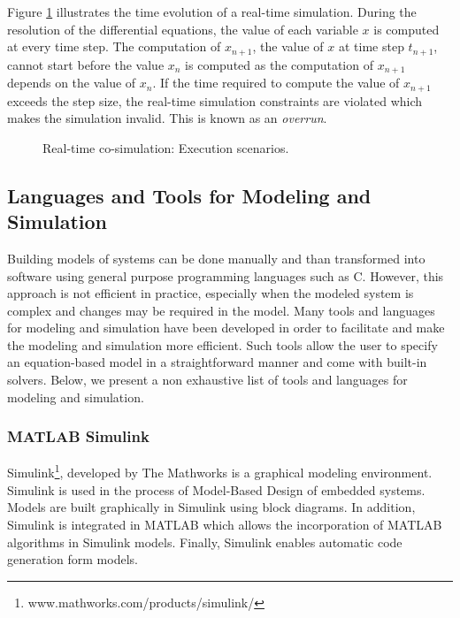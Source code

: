 Figure \ref{fig:rtcosim} illustrates the time evolution of a real-time simulation. During the resolution of the differential equations, the value of each variable $x$ is computed at every time step. The computation of $x_{n+1}$, the value of $x$ at time step $t_{n+1}$, cannot start before the value $x_n$ is computed as the computation of $x_{n+1}$ depends on the value of $x_n$. If the time required to compute the value of $x_{n+1}$ exceeds the step size, the real-time simulation constraints are violated which makes the simulation invalid. This is known as an \textit{overrun}.

\begin{figure}[phbt]
\centering

\caption{Real-time co-simulation: Execution scenarios.}
\label{fig:rtcosim}
\end{figure} 

\subsection{Languages and Tools for Modeling and Simulation}

Building models of systems can be done manually and than transformed into software using general purpose programming languages such as C. However, this approach is not efficient in practice, especially when the modeled system is complex and changes may be required in the model. Many tools and languages for modeling and simulation have been developed in order to facilitate and make the modeling and simulation more efficient. Such tools allow the user to specify an equation-based model in a straightforward manner and come with built-in solvers. Below, we present a non exhaustive list of tools and languages for modeling and simulation.


\subsubsection{MATLAB Simulink}
Simulink\footnote{www.mathworks.com/products/simulink/}, developed by The Mathworks is a graphical modeling environment. Simulink is used in the  process of Model-Based Design of embedded systems. Models are built graphically in Simulink using block diagrams. In addition, Simulink is integrated in MATLAB which allows the incorporation of MATLAB algorithms in Simulink models. Finally, Simulink enables automatic code generation form models.

